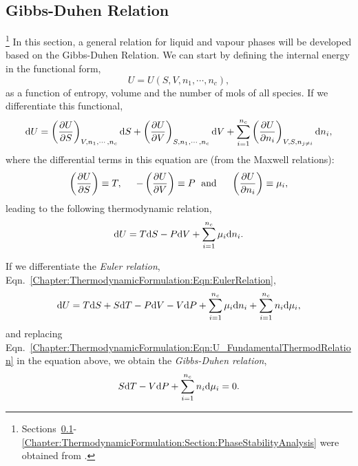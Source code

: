 \subsection{Gibbs-Duhen Relation}\label{Chapter:ThermodynamicFormulation:Section:GibbsDuhen}\footnote{Sections~\ref{Chapter:ThermodynamicFormulation:Section:GibbsDuhen}-\ref{Chapter:ThermodynamicFormulation:Section:PhaseStabilityAnalysis} were obtained from \citet{Henderson_Thesis,Henderson_2001}.}
In this section, a general relation for liquid and vapour phases will be developed based on the Gibbs-Duhen Relation. We can start by defining the internal energy in the functional form,
\begin{displaymath}
   U = U\left(S, V, n_{1}, \cdots, n_{c}\right),
\end{displaymath} 
as a function of entropy, volume and the number of mols of all species. If we differentiate this functional,
\begin{displaymath}
   \mathrm{d} U = \left(\displaystyle\frac{\partial U}{\partial S}\right)_{V,n_{1},\cdots,n_{c}}\mathrm{d} S + \left(\displaystyle\frac{\partial U}{\partial V}\right)_{S,n_{1},\cdots,n_{c}}\mathrm{d} V + \sum\limits_{i=1}^{n_{c}} \left(\displaystyle\frac{\partial U}{\partial n_{i}}\right)_{V,S,n_{j\ne i}}\mathrm{d} n_{i},
\end{displaymath}
where the differential terms in this equation are (from the Maxwell relations):
\begin{displaymath}
    \left(\displaystyle\frac{\partial U}{\partial S}\right) \equiv T, \hspace{.5cm} -\left(\displaystyle\frac{\partial U}{\partial V}\right) \equiv P \hspace{.1cm}\text{ and }\hspace{.4cm}  \left(\displaystyle\frac{\partial U}{\partial n_{i}}\right) \equiv \mu_{i},
\end{displaymath}
leading to the following thermodynamic relation,
\begin{equation}
     \mathrm{d} U = T\mathrm{d} S - P\mathrm{d} V + \sum\limits_{i=1}^{n_{c}}\mu_{i}\mathrm{d} n_{i}.\label{Chapter:ThermodynamicFormulation:Eqn:U_FundamentalThermodRelation}
\end{equation}

If we differentiate the {\it Euler relation}, Eqn.~\ref{Chapter:ThermodynamicFormulation:Eqn:EulerRelation},
\begin{displaymath}
  \mathrm{d} U = T\mathrm{d} S + S\mathrm{d} T - P\mathrm{d} V - V\mathrm{d} P + \sum\limits_{i=1}^{n_{c}}\mu_{i}\mathrm{d} n_{i} + \sum\limits_{i=1}^{n_{c}} n_{i}\mathrm{d}\mu_{i},
\end{displaymath}
and replacing Eqn.~\ref{Chapter:ThermodynamicFormulation:Eqn:U_FundamentalThermodRelation} in the equation above, we obtain the {\it Gibbs-Duhen relation},
\begin{equation}
   S\mathrm{d} T -V\mathrm{d} P + \sum\limits_{i=1}^{n_{c}} n_{i}\mathrm{d}\mu_{i} = 0.\label{Chapter:ThermodynamicFormulation:Eqn:GibbsDuhenRelation}
\end{equation}

